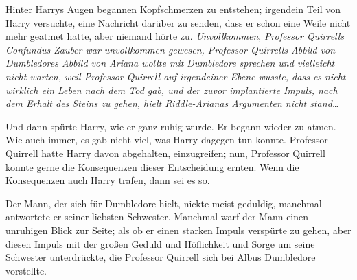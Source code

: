 Hinter Harrys Augen begannen Kopfschmerzen zu entstehen; irgendein Teil von Harry versuchte, eine Nachricht darüber zu senden, dass er schon eine Weile nicht mehr geatmet hatte, aber niemand hörte zu. \emph{Unvollkommen}, \emph{Professor Quirrells Confundus-Zauber war unvollkommen gewesen, Professor Quirrells Abbild von Dumbledores Abbild von Ariana wollte mit Dumbledore sprechen und vielleicht nicht warten, weil Professor Quirrell auf irgendeiner Ebene wusste, dass es nicht wirklich ein Leben nach dem Tod gab, und der zuvor implantierte Impuls, nach dem Erhalt des Steins zu gehen, hielt Riddle-Arianas Argumenten nicht stand…}

Und dann spürte Harry, wie er ganz ruhig wurde. Er begann wieder zu atmen.
Wie auch immer, es gab nicht viel, was Harry dagegen tun konnte. Professor Quirrell hatte Harry davon abgehalten, einzugreifen; nun, Professor Quirrell konnte gerne die Konsequenzen dieser Entscheidung ernten. Wenn die Konsequenzen auch Harry trafen, dann sei es so.

Der Mann, der sich für Dumbledore hielt, nickte meist geduldig, manchmal antwortete er seiner liebsten Schwester. Manchmal warf der Mann einen unruhigen Blick zur Seite; als ob er einen starken Impuls verspürte zu gehen, aber diesen Impuls mit der großen Geduld und Höflichkeit und Sorge um seine Schwester unterdrückte, die Professor Quirrell sich bei Albus Dumbledore vorstellte.

